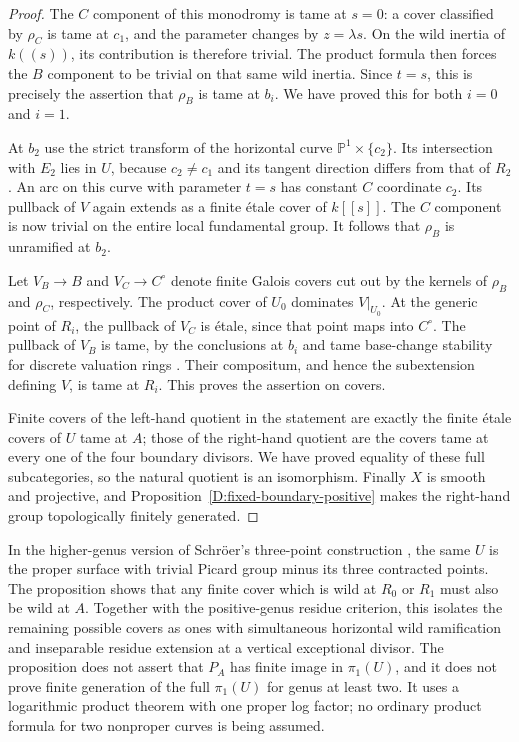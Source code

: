 \begin{proof}
The $C$ component of this monodromy is tame at $s=0$: a cover
classified by $\rho_C$ is tame at $c_1$, and the parameter changes
by $z=\lambda s$.  On the wild inertia of $k((s))$, its contribution
is therefore trivial.  The product formula then forces the
$B$ component to be trivial on that same wild inertia.  Since
$t=s$, this is precisely the assertion that $\rho_B$ is tame at
$b_i$.  We have proved this for both $i=0$ and $i=1$.

At $b_2$ use the strict transform of the horizontal curve
$\mathbb P^1\times\{c_2\}$.  Its intersection with $E_2$ lies in
$U$, because $c_2\ne c_1$ and its tangent direction differs from
that of $R_2$.  An arc on this curve with parameter $t=s$ has
constant $C$ coordinate $c_2$.  Its pullback of $V$ again extends
as a finite \'etale cover of $k[[s]]$.  The $C$ component is now
trivial on the entire local fundamental group.  It follows that
$\rho_B$ is unramified at $b_2$.

Let $V_B\to B$ and $V_C\to C^\circ$ denote finite Galois covers
cut out by the kernels of $\rho_B$ and $\rho_C$, respectively.
The product cover of $U_0$ dominates $V|_{U_0}$.  At the generic
point of $R_i$, the pullback of $V_C$ is \'etale, since that point
maps into $C^\circ$.  The pullback of $V_B$ is tame, by the
conclusions at $b_i$ and tame base-change stability for discrete
valuation rings
\cite[section 15.116, Lemma 15.116.9]{StacksBIndexTame}.
Their compositum, and hence the subextension defining $V$, is
tame at $R_i$.  This proves the assertion on covers.

Finite covers of the left-hand quotient in the statement are
exactly the finite \'etale covers of $U$ tame at $A$; those of the
right-hand quotient are the covers tame at every one of the four
boundary divisors.  We have proved equality of these full
subcategories, so the natural quotient is an isomorphism.
Finally $X$ is smooth and projective, and
Proposition~\ref{D:fixed-boundary-positive} makes the right-hand
group topologically finitely generated.
\end{proof}

\begin{remark}
In the higher-genus version of Schr\"oer's three-point construction
\cite[sections 2.5 and 3.1--3.2, author's PDF pp.~4--5]{Schroer1999D},
the same $U$ is the proper surface with trivial Picard group minus
its three contracted points.  The proposition shows that any
finite cover which is wild at $R_0$ or $R_1$ must also be wild at
$A$.  Together with the positive-genus residue criterion, this
isolates the remaining possible covers as ones with simultaneous
horizontal wild ramification and inseparable residue extension
at a vertical exceptional divisor.  The proposition does not
assert that $P_A$ has finite image in $\pi_1(U)$, and it does not
prove finite generation of the full $\pi_1(U)$ for genus at least
two.  It uses a logarithmic product theorem with one proper log
factor; no ordinary product formula for two nonproper curves is
being assumed.
\end{remark}
